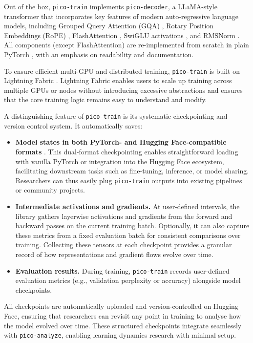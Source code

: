 Out of the box, \texttt{pico-train} implements \texttt{pico-decoder}, a LLaMA-style transformer \citep{touvron2023llama} that incorporates key features of modern auto-regressive language models, including Grouped Query Attention (GQA) \citep{ainslie2023gqa}, Rotary Position Embeddings (RoPE) \citep{su2024rope}, FlashAttention \citep{dao2022flashattention}, SwiGLU activations \citep{shazeer2020glu}, and RMSNorm \citep{zhang2019rmsnorm}. All components (except FlashAttention) are re-implemented from scratch in plain PyTorch \citep{paszke2017pytorch}, with an emphasis on readability and documentation. %

To ensure efficient multi-GPU and distributed training, \texttt{pico-train} is built on Lightning Fabric \citep{lightning-fabric}. Lightning Fabric enables users to scale up training across multiple GPUs or nodes without introducing excessive abstractions and ensures that the core training logic remains easy to understand and modify.

A distinguishing feature of \texttt{pico-train} is its systematic checkpointing and version control system. It automatically saves:
\begin{itemize}
    \item \textbf{Model states in both PyTorch- and Hugging Face-compatible formats} \citep{huggingface}. This dual-format checkpointing enables straightforward loading with vanilla PyTorch or integration into the Hugging Face ecosystem, facilitating downstream tasks such as fine-tuning, inference, or model sharing. Researchers can thus easily plug \texttt{pico-train} outputs into existing pipelines or community projects.

    \item \textbf{Intermediate activations and gradients.} At user-defined intervals, the library gathers layerwise activations and gradients from the forward and backward passes on the current training batch. Optionally, it can also capture these metrics from a fixed evaluation batch for consistent comparisons over training. Collecting these tensors at each checkpoint provides a granular record of how representations and gradient flows evolve over time.

    \item \textbf{Evaluation results.} During training, \texttt{pico-train} records user-defined evaluation metrics (e.g., validation perplexity or accuracy) alongside model checkpoints.
\end{itemize}
\vspace{-0.2em}
All checkpoints are automatically uploaded and version-controlled on Hugging Face, ensuring that researchers can revisit any point in training to analyse how the model evolved over time. These structured checkpoints integrate seamlessly with \texttt{pico-analyze}, enabling learning dynamics research with minimal setup.


